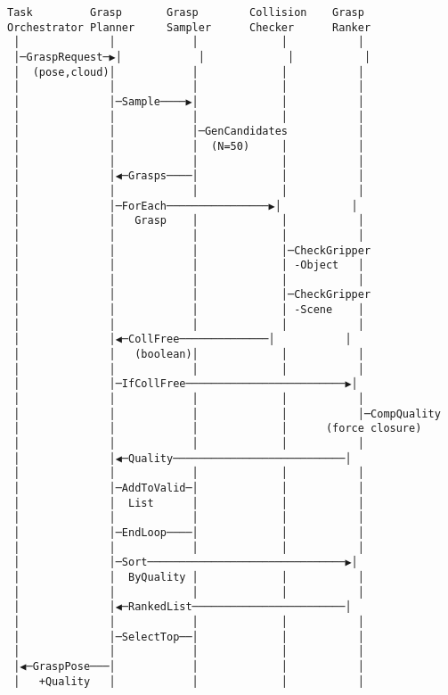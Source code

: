 \documentclass[
]{article}
\begin{document}
\begin{verbatim}
Task         Grasp       Grasp        Collision    Grasp
Orchestrator Planner     Sampler      Checker      Ranker
 │              │            │             │           │
 │─GraspRequest─▶│            │             │           │
 │  (pose,cloud)│            │             │           │
 │              │            │             │           │
 │              │─Sample────▶│             │           │
 │              │            │             │           │
 │              │            │─GenCandidates           │
 │              │            │  (N=50)     │           │
 │              │            │             │           │
 │              │◀─Grasps────│             │           │
 │              │            │             │           │
 │              │─ForEach────────────────▶│           │
 │              │   Grasp    │             │           │
 │              │            │             │           │
 │              │            │             │─CheckGripper
 │              │            │             │ -Object   │
 │              │            │             │           │
 │              │            │             │─CheckGripper
 │              │            │             │ -Scene    │
 │              │            │             │           │
 │              │◀─CollFree──────────────│           │
 │              │   (boolean)│             │           │
 │              │            │             │           │
 │              │─IfCollFree─────────────────────────▶│
 │              │            │             │           │
 │              │            │             │           │─CompQuality
 │              │            │             │      (force closure)
 │              │            │             │           │
 │              │◀─Quality───────────────────────────│
 │              │            │             │           │
 │              │─AddToValid─│             │           │
 │              │  List      │             │           │
 │              │            │             │           │
 │              │─EndLoop────│             │           │
 │              │            │             │           │
 │              │─Sort───────────────────────────────▶│
 │              │  ByQuality │             │           │
 │              │            │             │           │
 │              │◀─RankedList────────────────────────│
 │              │            │             │           │
 │              │─SelectTop──│             │           │
 │              │            │             │           │
 │◀─GraspPose───│            │             │           │
 │   +Quality   │            │             │           │
\end{verbatim}
\end{document}
